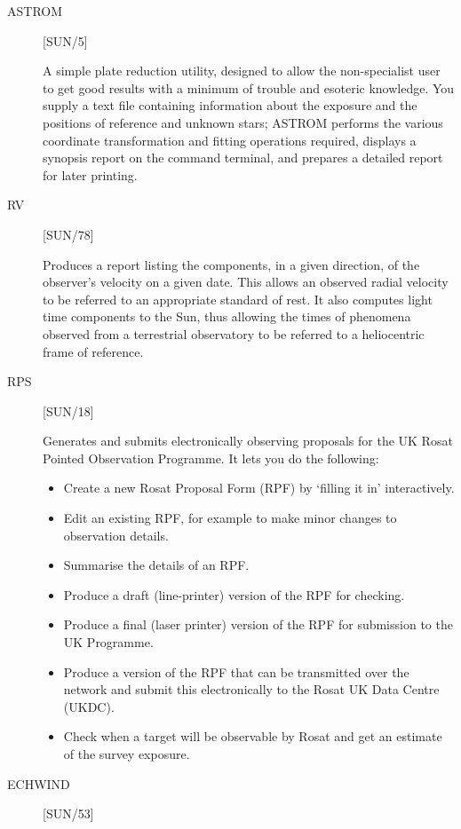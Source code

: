 \begin{description}
\item [ASTROM] \hfill [SUN/5]

A simple plate reduction utility, designed to allow the non-specialist
user to get good results with a minimum of trouble and esoteric knowledge.
You supply a text file containing information about the exposure and the
positions of reference and unknown stars;  ASTROM performs the various
coordinate transformation and fitting operations required, displays a synopsis
report on the command terminal, and prepares a detailed report for later
printing.

\item [RV] \hfill [SUN/78]

Produces a report listing the components, in a given direction, of the
observer's velocity on a given date.
This allows an observed radial velocity to be referred to an appropriate
standard of rest.
It also computes light time components to the Sun, thus allowing the times of
phenomena observed from a terrestrial observatory to be referred to a
heliocentric frame of reference.

\item [RPS] \hfill [SUN/18]

Generates and submits electronically observing proposals for the UK Rosat
Pointed Observation Programme. 
It lets you do the following:
\begin{itemize}
\item Create a new Rosat Proposal Form (RPF) by `filling it in' interactively.
\item Edit an existing RPF, for example to make minor changes to observation
 details.
\item Summarise the details of an RPF.
\item Produce a draft (line-printer) version of the RPF for checking.
\item Produce a final (laser printer) version of the RPF for submission to the
 UK Programme.
\item Produce a version of the RPF that can be transmitted over the network and
 submit this electronically to the Rosat UK Data Centre (UKDC).
\item Check when a target will be observable by Rosat and get an estimate of
 the survey exposure.
\end{itemize}

\item [ECHWIND] \hfill [SUN/53]


\end{description}
